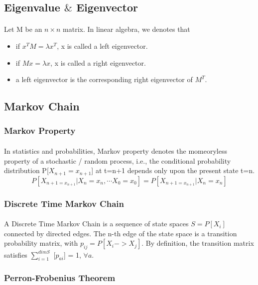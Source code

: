 \documentclass{article}
\begin{document}
      \subsection{Eigenvalue $\&$ Eigenvector}
        \paragraph{}
        Let M be an $n\times n$ matrix. In linear algebra, we denotes that
        \begin{itemize}
            \item if $x^TM=\lambda x^T$, x is called a left eigenvector.
            \item if $Mx=\lambda x$, x is called a right eigenvector.
            \item a left eigenvector is the corresponding right eigenvector of $M^T$.
        \end{itemize}
      \subsection{Markov Chain}
        \subsubsection{Markov Property}
        \paragraph{}
        In statistics and probabilities, Markov property denotes the momeoryless property of a stochastic / random process, i.e.,
        the conditional probability distribution P[$X_{n+1}=x_{n+1}$] at t=n+1 depends only upon the present state t=n.
        $$P[X_{n+1=x_{n+1}}\vert X_n=x_n,\cdots X_0=x_0]=P[X_{n+1=x_{n+1}}\vert X_n=x_n]$$
        \subsubsection{Discrete Time Markov Chain}
        \paragraph{}
        A Discrete Time Markov Chain is a sequence of state spaces $S={P[X_i]}$ connected by directed edges.
        The n-th edge of the state space is a transition probability matrix, with $p_{ij}=P[X_i->X_j]$.
        By definition, the transition matrix satisfies $\sum_{i=1}^{dim S}$ [$p_{ai}$] = 1, $\forall a$.
        \subsubsection{Perron-Frobenius Theorem}
\end{document}
